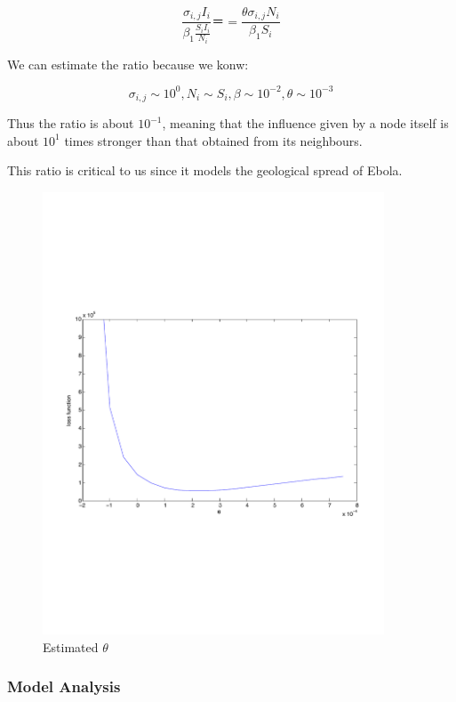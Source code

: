 \documentclass[11pt]{article}
\begin{document}
$$
\frac{\sigma_{i,j} I_i}{\beta_1 \frac{S_i I_i}{N_i} } ＝ =  \frac{\theta \sigma_{i,j} N_i}{\beta_1 S_i}
$$

We can estimate the ratio because we konw:

$$
\sigma_{i,j} \sim 10^0, N_i \sim S_i, \beta \sim 10^{-2}, \theta \sim 10^{-3}
$$

Thus the ratio is about $10^{-1}$, meaning that the influence given by a node itself is about $10^1$ times stronger than that obtained from its neighbours.

This ratio is critical to us since it models the geological spread of Ebola. 

\begin{figure}[hbtp]
\begin{center}
  \includegraphics[width=4in]{graph/est3.pdf}
  \caption{Estimated $\theta$}
  \label{est}
\end{center}  
\end{figure}

\label{eth}

\subsubsection{Model Analysis}
\end{document}

